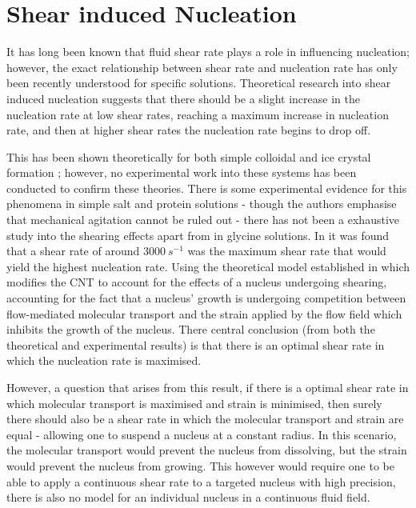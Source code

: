 \section{Shear induced Nucleation}
It has long been known that fluid shear rate plays a role in 
influencing nucleation; however, the exact relationship between 
shear rate and nucleation rate has only been recently understood 
for specific solutions. Theoretical research into shear induced 
nucleation suggests that there should be a slight increase in the 
nucleation rate at low shear rates, reaching a maximum increase in 
nucleation rate, and then at higher shear rates the nucleation rate 
begins to drop off. 

This has been shown theoretically for both simple colloidal 
\cite{Mura2016,Debuysschere2023,Richard2015} and ice crystal 
formation \cite{Goswami2020}; however, no experimental work 
into these systems has been conducted to confirm these theories. 
There is some experimental evidence for this phenomena in simple 
salt and protein solutions - though the authors emphasise that 
mechanical agitation cannot be ruled out - there has not been a 
exhaustive study into the shearing effects apart from in glycine 
solutions. In \cite{Debuysschere2023} it was found that a shear 
rate of around $3000\ s^{-1}$ was the maximum shear rate that 
would yield the highest nucleation rate. Using the theoretical 
model established in \cite{Mura2016,2001} which modifies the CNT 
to account for the effects of a nucleus undergoing shearing, 
accounting for the fact that a nucleus' growth is undergoing 
competition between flow-mediated molecular transport and the 
strain applied by the flow field which inhibits the growth of 
the nucleus. There central conclusion (from both the theoretical 
and experimental results) is that there is an optimal shear rate 
in which the nucleation rate is maximised. 

However, a question that arises from this result, if there is 
a optimal shear rate in which molecular transport is maximised 
and strain is minimised, then surely there should also be a shear 
rate in which the molecular transport and strain are equal - 
allowing one to suspend a nucleus at a constant radius. In this 
scenario, the molecular transport would prevent the nucleus from 
dissolving, but the strain would prevent the nucleus from growing. 
This however would require one to be able to apply a continuous 
shear rate to a targeted nucleus with high precision, there is 
also no model for an individual nucleus in a continuous fluid 
field. 

